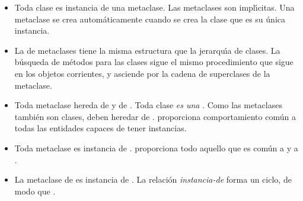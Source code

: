 \documentclass[a4paper,10pt,twoside]{book}
\begin{document}
\begin{itemize}
\item Toda clase es instancia de una metaclase.
	Las metaclases son impl\'{\i}citas. Una metaclase se crea autom\'aticamente cuando se crea la clase que es su \'unica instancia.

\item La  de metaclases tiene la misma estructura que la jerarqu\'{\i}a de clases.
	La b\'usqueda de m\'etodos para las clases sigue el mismo procedimiento que sigue en los objetos corrientes, y asciende por la cadena de superclases de la metaclase.

\item Toda metaclase hereda de  y de .
        Toda clase \emph{es una} . Como las metaclases tambi\'en son clases, deben heredar de .  proporciona comportamiento com\'un a todas las entidades capaces de tener instancias.

\item Toda metaclase es instancia de .
	 proporciona todo aquello que es com\'un a  y a .

\item La metaclase de  es instancia de .
	La relaci\'on \emph{instancia-de} forma un ciclo, de modo que .
\end{itemize}
\ifx\wholebook\relax\else
\end{document}
